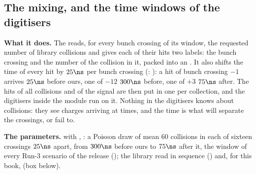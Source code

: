\subsection{The mixing, and the time windows of the digitisers}
\label{sec:11_mix}

\textbf{What it does.} The  reads, for every bunch crossing of its window, the requested number of
library collisions and gives each of their hits two labels: the bunch crossing and the number of the collision in it,
packed into an . It also shifts the time of every hit by $25\ns$ per bunch crossing
(: ): a hit of
bunch crossing $-1$ arrives $25\ns$ before ours, one of $-12$ $300\ns$ before, one of $+3$ $75\ns$ after. The hits of all collisions and of the
signal are then put in one  per collection, and the digitisers inside the module run on it. Nothing
in the digitisers knows about collisions: they see charges arriving at times, and the time is what will separate the
crossings, or fail to.

\textbf{The parameters.}  with , : a Poisson draw of mean 60
collisions in each of sixteen crossings $25\ns$ apart, from $300\ns$ before ours to $75\ns$ after it, the window of
every Run-3 scenario of the release (); the library read in sequence
() and, for this book,  (box below).

